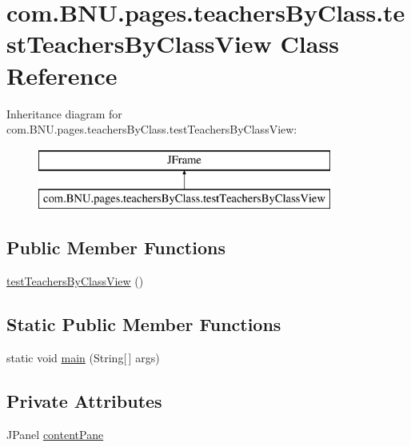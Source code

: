 \hypertarget{classcom_1_1_b_n_u_1_1pages_1_1teachers_by_class_1_1test_teachers_by_class_view}{}\section{com.\+B\+N\+U.\+pages.\+teachers\+By\+Class.\+test\+Teachers\+By\+Class\+View Class Reference}
\label{classcom_1_1_b_n_u_1_1pages_1_1teachers_by_class_1_1test_teachers_by_class_view}
Inheritance diagram for com.\+B\+N\+U.\+pages.\+teachers\+By\+Class.\+test\+Teachers\+By\+Class\+View\+:\begin{figure}[H]
\begin{center}
\leavevmode
\includegraphics[height=2.000000cm]{classcom_1_1_b_n_u_1_1pages_1_1teachers_by_class_1_1test_teachers_by_class_view}
\end{center}
\end{figure}
\subsection*{Public Member Functions}
\begin{DoxyCompactItemize}
\item 
\mbox{\hyperlink{classcom_1_1_b_n_u_1_1pages_1_1teachers_by_class_1_1test_teachers_by_class_view_aa06b8d001b444576d43eb968c626c0ff}{test\+Teachers\+By\+Class\+View}} ()
\end{DoxyCompactItemize}
\subsection*{Static Public Member Functions}
\begin{DoxyCompactItemize}
\item 
static void \mbox{\hyperlink{classcom_1_1_b_n_u_1_1pages_1_1teachers_by_class_1_1test_teachers_by_class_view_a4cfbce5b60a815fe52a961e89507c395}{main}} (String\mbox{[}$\,$\mbox{]} args)
\end{DoxyCompactItemize}
\subsection*{Private Attributes}
\begin{DoxyCompactItemize}
\item 
J\+Panel \mbox{\hyperlink{classcom_1_1_b_n_u_1_1pages_1_1teachers_by_class_1_1test_teachers_by_class_view_ac6075f516f2640b3909be6f29533fd2e}{content\+Pane}}
\end{DoxyCompactItemize}


